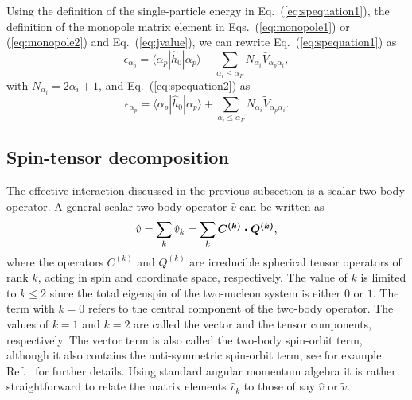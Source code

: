 \documentclass[aps,showpacs,floatfix,nofootinbib,preprintnumbers,superscriptaddress,amsmath,amssymb]{revtex4-1}
\begin{document}
Using the definition of the single-particle energy in
Eq.~(\ref{eq:spequation1}), the definition of the monopole matrix
element in Eqs.~(\ref{eq:monopole1}) or (\ref{eq:monopole2}) and Eq.~(\ref{eq:jvalue}), we can rewrite
Eq.~(\ref{eq:spequation1}) as
\begin{equation}
\epsilon_{\alpha_{p}}=\langle \alpha_p|\hat{h}_0|\alpha_p\rangle+\sum_{\alpha_i\le \alpha_F}N_{\alpha_i}\bar{V}_{\alpha_p\alpha_i},
\label{eq:spmono1}
\end{equation}
with $N_{\alpha_i}=2\alpha_i+1$, and Eq.~(\ref{eq:spequation2}) as 
\begin{equation}
\epsilon_{\alpha_{p}}=\langle \alpha_p|\hat{h}_0|\alpha_p\rangle+\sum_{\alpha_i\le \alpha_F}N_{\alpha_i}\tilde{V}_{\alpha_p\alpha_i}.
\label{eq:spmono2}
\end{equation}




\subsection{Spin-tensor decomposition}\label{subsec:spintensor}

The effective interaction discussed in the previous subsection is a
scalar two-body operator. A general scalar two-body operator
$\hat{v}$ can be written as
\begin{equation}
\hat{v} = \sum_{k} \hat{v}_{k} = \sum_{k} \mbox{\boldmath $C^{(k)}\cdot
Q^{(k)}$},
\end{equation}
where the operators \mbox{\boldmath $C^{(k)}$} and
\mbox{\boldmath $Q^{(k)}$} are irreducible spherical tensor
operators of rank $k$, acting in spin and coordinate space,
respectively. The value of $k$ is limited to $k\le 2$ since the total eigenspin of the two-nucleon
system is either $0$ or $1$. The term with
$k=0$ refers to the central component of the two-body
operator.
The values of $k=1$ and $k=2$ are called
the vector and the tensor components, respectively. The vector term is also called the two-body spin-orbit term, although it
also contains the anti-symmetric spin-orbit term, see for example Ref.~\cite{conze1973} for further details.
Using standard angular momentum algebra it is rather straightforward to relate the matrix elements  $\hat{v}_{k}$ to
those of say $\hat{v}$ or $\tilde{v}$. 
\end{document}
